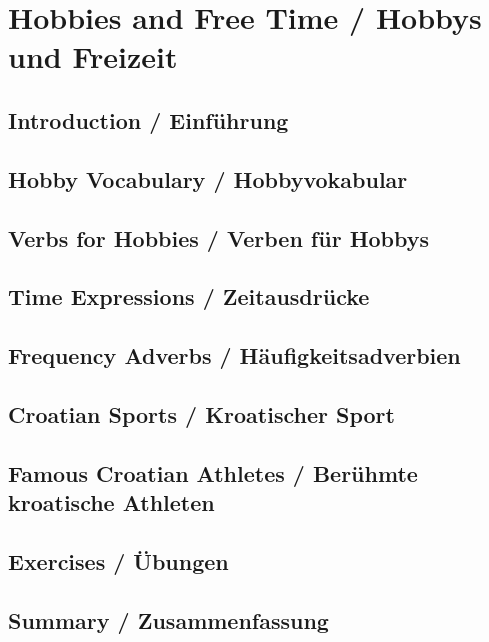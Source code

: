 \chapter{Hobbies and Free Time / Hobbys und Freizeit}

\section{Introduction / Einführung}

\section{Hobby Vocabulary / Hobbyvokabular}

\section{Verbs for Hobbies / Verben für Hobbys}

\section{Time Expressions / Zeitausdrücke}

\section{Frequency Adverbs / Häufigkeitsadverbien}

\section{Croatian Sports / Kroatischer Sport}

\section{Famous Croatian Athletes / Berühmte kroatische Athleten}

\section{Exercises / Übungen}

\section{Summary / Zusammenfassung}
